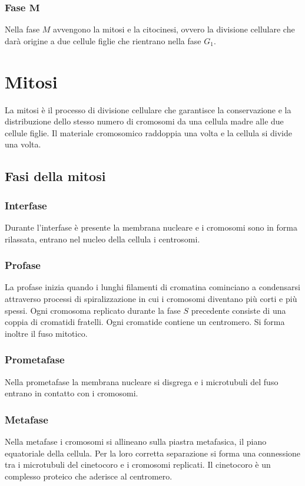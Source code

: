 \subsubsection{Fase $\mathbf{M}$}
Nella fase $M$ avvengono la mitosi e la citocinesi, ovvero la divisione cellulare che dar\`a origine a due cellule figlie che rientrano nella fase $G_1$.
\section{Mitosi}
La mitosi \`e il processo di divisione cellulare che garantisce la conservazione e la distribuzione dello stesso numero di cromosomi da una cellula madre alle due cellule figlie. Il
materiale cromosomico raddoppia una volta e la cellula si divide una volta. 
\subsection{Fasi della mitosi}
\subsubsection{Interfase}
Durante l'interfase \`e presente la membrana nucleare e i cromosomi sono in forma rilassata, entrano nel nucleo della cellula i centrosomi. 
\subsubsection{Profase}
La profase inizia quando i lunghi filamenti di cromatina cominciano a condensarsi attraverso processi di spiralizzazione in cui i cromosomi diventano pi\`u corti e pi\`u spessi. Ogni
cromosoma replicato durante la fase $S$ precedente consiste di una coppia di cromatidi fratelli. Ogni cromatide contiene un centromero. Si forma inoltre il fuso mitotico. 
\subsubsection{Prometafase}
Nella prometafase la membrana nucleare si disgrega e i microtubuli del fuso entrano in contatto con i cromosomi. 
\subsubsection{Metafase}
Nella metafase i cromosomi si allineano sulla piastra metafasica, il piano equatoriale della cellula. Per la loro corretta separazione si forma una connessione tra i microtubuli del 
cinetocoro e i cromosomi replicati. Il cinetocoro \`e un complesso proteico che aderisce al centromero. 
